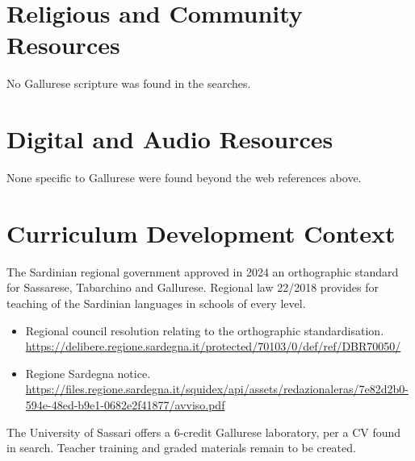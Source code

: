 \documentclass[12pt]{article}
\begin{document}
\section{Religious and Community Resources}
No Gallurese scripture was found in the searches.

\section{Digital and Audio Resources}
None specific to Gallurese were found beyond the web references above.

\section{Curriculum Development Context}
The Sardinian regional government approved in 2024 an orthographic standard for Sassarese, Tabarchino and Gallurese. Regional law 22/2018 provides for teaching of the Sardinian languages in schools of every level.
\begin{itemize}
\item Regional council resolution relating to the orthographic standardisation. \url{https://delibere.regione.sardegna.it/protected/70103/0/def/ref/DBR70050/}
\item Regione Sardegna notice. \url{https://files.regione.sardegna.it/squidex/api/assets/redazionaleras/7e82d2b0-594e-48ed-b9e1-0682e2f41877/avviso.pdf}
\end{itemize}
The University of Sassari offers a 6-credit Gallurese laboratory, per a CV found in search. Teacher training and graded materials remain to be created.
\end{document}
